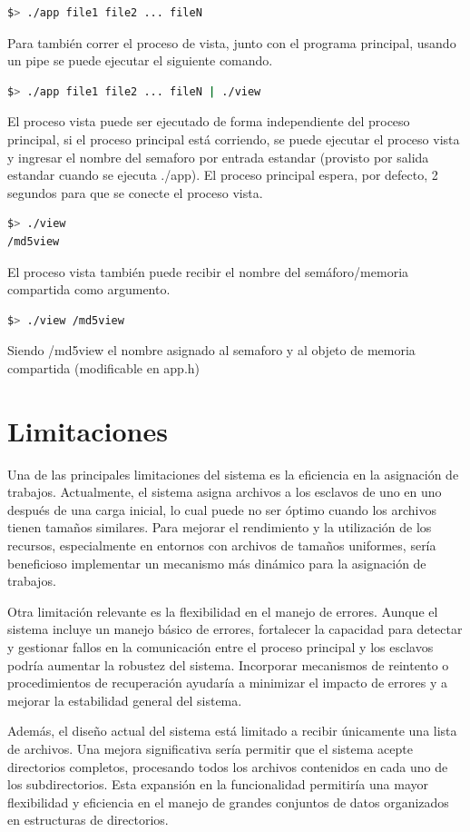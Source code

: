 \documentclass{article}
\begin{document}
\begin{lstlisting}[language=bash]
$> ./app file1 file2 ... fileN
\end{lstlisting}
Para también correr el proceso de vista, junto con el programa principal, usando un pipe se puede ejecutar el siguiente comando.
\begin{lstlisting}[language=bash]
$> ./app file1 file2 ... fileN | ./view
\end{lstlisting}
El proceso vista puede ser ejecutado de forma independiente del proceso principal, si el proceso principal está corriendo, se puede ejecutar el proceso vista y ingresar el nombre del semaforo  por entrada estandar (provisto por salida estandar cuando se ejecuta ./app). El proceso principal espera, por defecto, 2 segundos para que se conecte el proceso vista.
\begin{lstlisting}[language=bash]
$> ./view
/md5view
\end{lstlisting}
El proceso vista también puede recibir el nombre del semáforo/memoria compartida como argumento.
\begin{lstlisting}[language=bash]
$> ./view /md5view
\end{lstlisting}
Siendo /md5view el nombre asignado al semaforo y al objeto de memoria compartida (modificable en app.h)

\section{Limitaciones}

Una de las principales limitaciones del sistema es la eficiencia en la asignación de trabajos. Actualmente, el sistema asigna archivos a los esclavos de uno en uno después de una carga inicial, lo cual puede no ser óptimo cuando los archivos tienen tamaños similares. Para mejorar el rendimiento y la utilización de los recursos, especialmente en entornos con archivos de tamaños uniformes, sería beneficioso implementar un mecanismo más dinámico para la asignación de trabajos.

Otra limitación relevante es la flexibilidad en el manejo de errores. Aunque el sistema incluye un manejo básico de errores, fortalecer la capacidad para detectar y gestionar fallos en la comunicación entre el proceso principal y los esclavos podría aumentar la robustez del sistema. Incorporar mecanismos de reintento o procedimientos de recuperación ayudaría a minimizar el impacto de errores y a mejorar la estabilidad general del sistema.

Además, el diseño actual del sistema está limitado a recibir únicamente una lista de archivos. Una mejora significativa sería permitir que el sistema acepte directorios completos, procesando todos los archivos contenidos en cada uno de los subdirectorios. Esta expansión en la funcionalidad permitiría una mayor flexibilidad y eficiencia en el manejo de grandes conjuntos de datos organizados en estructuras de directorios.
\end{document}
